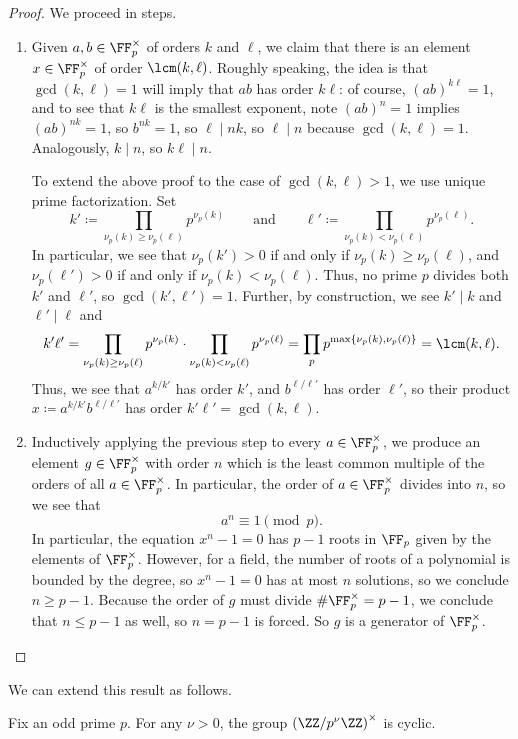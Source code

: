 \documentclass[../notes.tex]{subfiles}
\begin{document}
\begin{proof}
	We proceed in steps.
	\begin{enumerate}
		\item Given $a,b\in\FF_p^\times$ of orders $k$ and $\ell$, we claim that there is an element $x\in\FF_p^\times$ of order $\lcm(k,\ell)$. Roughly speaking, the idea is that $\gcd(k,\ell)=1$ will imply that $ab$ has order $k\ell$: of course, $(ab)^{k\ell}=1$, and to see that $k\ell$ is the smallest exponent, note $(ab)^n=1$ implies $(ab)^{nk}=1$, so $b^{nk}=1$, so $\ell\mid nk$, so $\ell\mid n$ because $\gcd(k,\ell)=1$. Analogously, $k\mid n$, so $k\ell\mid n$.
		
		To extend the above proof to the case of $\gcd(k,\ell)>1$, we use unique prime factorization. Set
		\[k'\coloneqq\prod_{\nu_p(k)\ge\nu_p(\ell)}p^{\nu_p(k)}\qquad\text{and}\qquad\ell'\coloneqq\prod_{\nu_p(k)<\nu_p(\ell)}p^{\nu_p(\ell)}.\]
		In particular, we see that $\nu_p(k')>0$ if and only if $\nu_p(k)\ge\nu_p(\ell)$, and $\nu_p(\ell')>0$ if and only if $\nu_p(k)<\nu_p(\ell)$. Thus, no prime $p$ divides both $k'$ and $\ell'$, so $\gcd(k',\ell')=1$. Further, by construction, we see $k'\mid k$ and $\ell'\mid\ell$ and
		\[k'\ell'=\prod_{\nu_p(k)\ge\nu_p(\ell)}p^{\nu_p(k)}\cdot\prod_{\nu_p(k)<\nu_p(\ell)}p^{\nu_p(\ell)}=\prod_pp^{\max\{\nu_p(k),\nu_p(\ell)\}}=\lcm(k,\ell).\]
		Thus, we see that $a^{k/k'}$ has order $k'$, and $b^{\ell/\ell'}$ has order $\ell'$, so their product $x\coloneqq a^{k/k'}b^{\ell/\ell'}$ has order $k'\ell'=\gcd(k,\ell)$.

		\item Inductively applying the previous step to every $a\in\FF_p^\times$, we produce an element $g\in\FF_p^\times$ with order $n$ which is the least common multiple of the orders of all $a\in\FF_p^\times$. In particular, the order of $a\in\FF_p^\times$ divides into $n$, so we see that
		\[a^n\equiv1\pmod p.\]
		In particular, the equation $x^n-1=0$ has $p-1$ roots in $\FF_p$ given by the elements of $\FF_p^\times$. However, for a field, the number of roots of a polynomial is bounded by the degree, so $x^n-1=0$ has at most $n$ solutions, so we conclude $n\ge p-1$. Because the order of $g$ must divide $\#\FF_p^\times=p-1$, we conclude that $n\le p-1$ as well, so $n=p-1$ is forced. So $g$ is a generator of $\FF_p^\times$.
		\qedhere
	\end{enumerate}
\end{proof}
We can extend this result as follows.
\begin{proposition} \label{prop:prime-power-cyclic}
	Fix an odd prime $p$. For any $\nu>0$, the group $\left(\ZZ/p^\nu\ZZ\right)^\times$ is cyclic.
\end{proposition}
\end{document}

